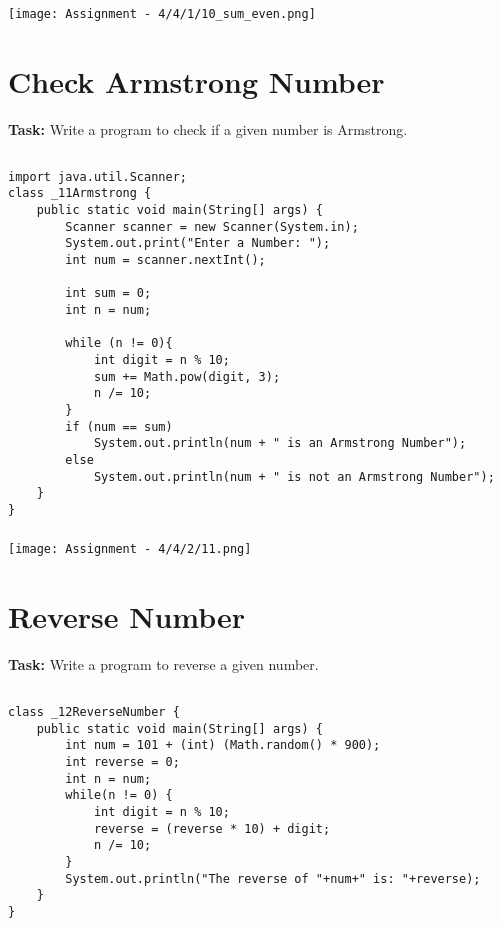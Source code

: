 \documentclass[12pt,a4paper]{article}
\begin{document}
\subsubsection{}
\begin{center}
    \texttt{[image: Assignment - 4/4/1/10\_sum\_even.png]}
\end{center}


\section{Check Armstrong Number}
\textbf{Task:} Write a program to check if a given number is Armstrong.

\subsection{}
\begin{lstlisting}
import java.util.Scanner;
class _11Armstrong {
    public static void main(String[] args) {
        Scanner scanner = new Scanner(System.in);
        System.out.print("Enter a Number: ");
        int num = scanner.nextInt();
    
        int sum = 0;
        int n = num;
    
        while (n != 0){
            int digit = n % 10;
            sum += Math.pow(digit, 3);
            n /= 10;
        }
        if (num == sum)
            System.out.println(num + " is an Armstrong Number");
        else 
            System.out.println(num + " is not an Armstrong Number");
    }
}
\end{lstlisting}

\subsubsection{}
\begin{center}
    \texttt{[image: Assignment - 4/4/2/11.png]}
\end{center}


\section{Reverse Number}
\textbf{Task:} Write a program to reverse a given number.

\subsection{}
\begin{lstlisting}
class _12ReverseNumber {
    public static void main(String[] args) {
        int num = 101 + (int) (Math.random() * 900);
        int reverse = 0;
        int n = num;
        while(n != 0) {
            int digit = n % 10;
            reverse = (reverse * 10) + digit;
            n /= 10;
        }
        System.out.println("The reverse of "+num+" is: "+reverse);
    }
}
\end{lstlisting}
\end{document}
